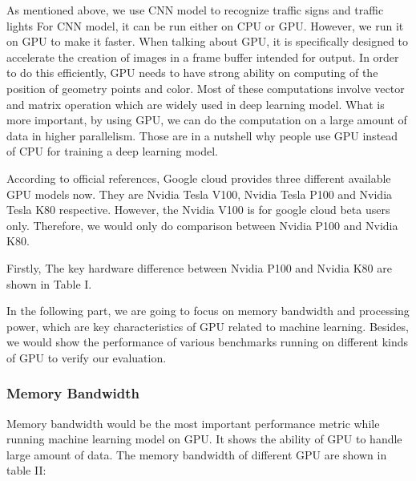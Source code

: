 \documentclass[conference]{IEEEtran}
\begin{document}
As mentioned above, we use CNN model to recognize traffic signs and traffic lights For CNN model, it can be run either on CPU or GPU. However, we run it on GPU to make it faster. When talking about GPU, it is specifically designed to accelerate the creation of images in a frame buffer intended for output. In order to do this efficiently, GPU needs to have strong ability on computing of the position of geometry points and color. Most of these computations involve vector and matrix operation which are widely used in deep learning model. What is more important, by using GPU, we can do the computation on a large amount of data in higher parallelism. Those are in a nutshell why people use GPU instead of CPU for training a deep learning model. 

According to official references, Google cloud provides three different available GPU models now. They are Nvidia Tesla V100, Nvidia Tesla P100 and Nvidia Tesla K80 respective. However, the Nvidia V100 is for google cloud beta users only. Therefore, we would only do comparison between Nvidia P100 and Nvidia K80.




Firstly, The key hardware difference between Nvidia P100 and Nvidia K80 are shown in Table I.


In the following part, we are going to focus on memory bandwidth and processing power, which are key characteristics of GPU related to machine learning. Besides, we would show the performance of various benchmarks running on different kinds of GPU to verify our evaluation. 

\subsubsection{Memory Bandwidth}
Memory bandwidth would be the most important performance metric while running machine learning model on GPU. It shows the ability of GPU to handle large amount of data. The memory bandwidth of different GPU are shown in table II:
\end{document}
